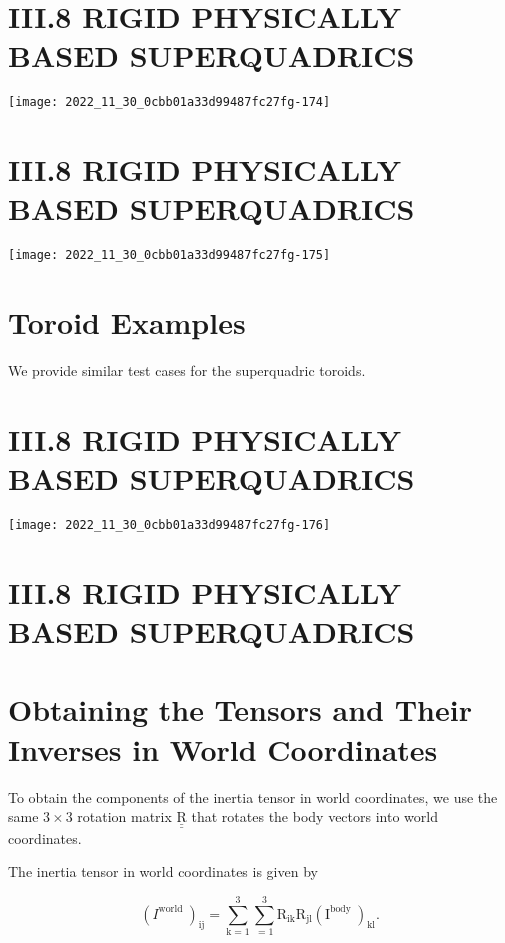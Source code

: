 \section{III.8 RIGID PHYSICALLY BASED SUPERQUADRICS}
\begin{center}
\texttt{[image: 2022\_11\_30\_0cbb01a33d99487fc27fg-174]}
\end{center}

\section{III.8 RIGID PHYSICALLY BASED SUPERQUADRICS}
\begin{center}
\texttt{[image: 2022\_11\_30\_0cbb01a33d99487fc27fg-175]}
\end{center}

\section{Toroid Examples}
We provide similar test cases for the superquadric toroids.

\section{III.8 RIGID PHYSICALLY BASED SUPERQUADRICS}
\begin{center}
\texttt{[image: 2022\_11\_30\_0cbb01a33d99487fc27fg-176]}
\end{center}

\section{III.8 RIGID PHYSICALLY BASED SUPERQUADRICS}
\section{Obtaining the Tensors and Their Inverses in World Coordinates}
To obtain the components of the inertia tensor in world coordinates, we use the same $3 \times 3$ rotation matrix $\underline{\underline{\mathrm{R}}}$ that rotates the body vectors into world coordinates.

The inertia tensor in world coordinates is given by

$$
\left(I^{\text {world }}\right)_{\mathrm{ij}}=\sum_{\mathrm{k}=1}^{3} \sum_{=1}^{3} \mathrm{R}_{\mathrm{ik}} \mathrm{R}_{\mathrm{jl}}\left(\mathrm{I}^{\text {body }}\right)_{\mathrm{kl}} .
$$

